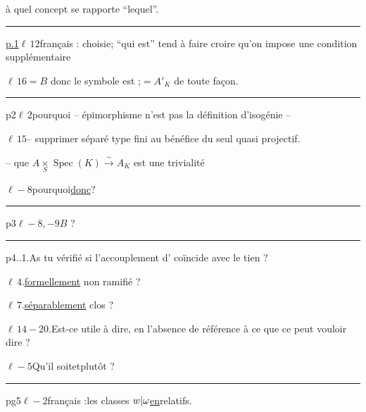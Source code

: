 à quel concept se rapporte ``lequel''.

\rule{\linewidth}{0.3pt}

\uline{p.1}\quad $\ell\,12$\quad français : choisie\quad ; ``qui est'' tend à faire croire qu'on impose une condition supplémentaire

$\ell\,16$\quad $=B$ donc le symbole est ;\quad $=A'_K$ de toute façon.

\rule{\linewidth}{0.3pt}

p2\quad $\ell\,2$\quad pourquoi
\quad -- épimorphisme n'est pas la définition d'isogénie --

$\ell\,15$\quad -- supprimer séparé type fini au bénéfice du seul quasi projectif.

-- que $A\mathbin{\underset{S}{\times}}\operatorname{Spec}(K)\xrightarrow{\sim}A_K$ est une trivialité



$\ell-8$\quad pourquoi\quad \uline{donc}\qquad ?

\rule{\linewidth}{0.3pt}

p3\quad $\ell-8,-9$\qquad $B$ ?

\rule{\linewidth}{0.3pt}

p4..1.\quad As tu vérifié si l'accouplement d' coïncide avec le tien ?

$\ell\,4$.\quad \uline{formellement} non ramifié ?

$\ell\,7$.\quad \uline{séparablement} clos ?

$\ell\,14-20$.\quad Est-ce utile à dire, en l'absence de référence à ce que ce peut vouloir dire ?

$\ell-5$\quad Qu'il soit\qquad et\qquad {}\qquad plutôt ?

\rule{\linewidth}{0.3pt}

pg5\quad $\ell-2$\quad français :\quad les classes $w|\omega$\qquad \uline{en}\qquad relatifs.


